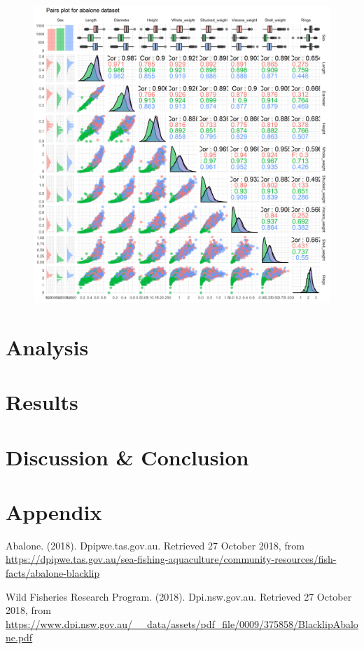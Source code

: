 \documentclass[9pt,twocolumn,margin=1mm]{article}
\begin{document}
		\begin{figure}[!htbp]
			\centering
			\includegraphics[width=\columnwidth]{ggpairs}
			\caption{}
			\label{fig:ggpairs}
		\end{figure}
		
		
	\section{Analysis}
	
	\section{Results}
	
	\section{Discussion \& Conclusion}
	
	\section{Appendix}
	
	\begin{thebibliography}{9}
		Abalone. (2018). Dpipwe.tas.gov.au. Retrieved 27 October 2018, from \url{https://dpipwe.tas.gov.au/sea-fishing-aquaculture/community-resources/fish-facts/abalone-blacklip}
		
		Wild Fisheries Research Program. (2018). Dpi.nsw.gov.au. Retrieved 27 October 2018, from		\url{https://www.dpi.nsw.gov.au/__data/assets/pdf_file/0009/375858/BlacklipAbalone.pdf}
	\end{thebibliography}
\end{document}
